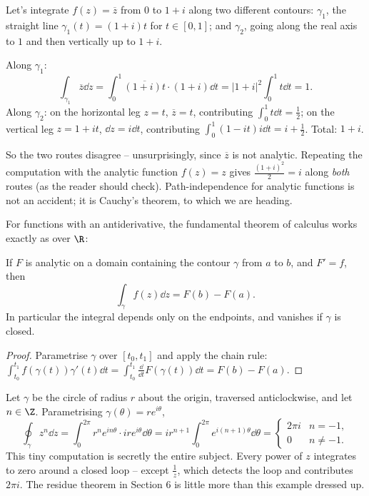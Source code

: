 \begin{example}
	Let's integrate $f(z) = \overline z$ from $0$ to $1 + i$ along two different contours: $\gamma_1$, the straight line $\gamma_1(t) = (1 + i)t$ for $t \in [0,1]$; and $\gamma_2$, going along the real axis to $1$ and then vertically up to $1 + i$.

	Along $\gamma_1$:
	$$
	\int_{\gamma_1} \overline z \dd z = \int_0^1 \overline{(1+i)t} \cdot (1 + i) \dd t = |1 + i|^2 \int_0^1 t \dd t = 1.
	$$
	Along $\gamma_2$: on the horizontal leg $z = t$, $\overline z = t$, contributing $\int_0^1 t \dd t = \frac 12$; on the vertical leg $z = 1 + it$, $\dd z = i \dd t$, contributing $\int_0^1 (1 - it) i \dd t = i + \frac{1}{2}$. Total: $1 + i$.

	So the two routes disagree -- unsurprisingly, since $\overline z$ is not analytic. Repeating the computation with the analytic function $f(z) = z$ gives $\frac{(1+i)^2}{2} = i$ along \emph{both} routes (as the reader should check). Path-independence for analytic functions is not an accident; it is Cauchy's theorem, to which we are heading.
\end{example}

For functions with an antiderivative, the fundamental theorem of calculus works exactly as over $\R$:

\begin{proposition}
	If $F$ is analytic on a domain containing the contour $\gamma$ from $a$ to $b$, and $F' = f$, then
	$$
	\int_\gamma f(z) \dd z = F(b) - F(a).
	$$
	In particular the integral depends only on the endpoints, and vanishes if $\gamma$ is closed.
\end{proposition}
\begin{proof}
	Parametrise $\gamma$ over $[t_0, t_1]$ and apply the chain rule: $\int_{t_0}^{t_1} f(\gamma(t))\gamma'(t) \dd t = \int_{t_0}^{t_1} \frac{\dd}{\dd t} F(\gamma(t)) \dd t = F(b) - F(a)$.
\end{proof}

\begin{example}
	Let $\gamma$ be the circle of radius $r$ about the origin, traversed anticlockwise, and let $n \in \Z$. Parametrising $\gamma(\theta) = re^{i\theta}$,
	$$
	\oint_\gamma z^n \dd z = \int_0^{2\pi} r^n e^{in\theta} \cdot ir e^{i\theta} \dd \theta = i r^{n+1}\int_0^{2\pi} e^{i(n+1)\theta} \dd\theta =
	\begin{cases}
		2\pi i & n = -1, \\
		0 & n \neq -1.
	\end{cases}
	$$
	This tiny computation is secretly the entire subject. Every power of $z$ integrates to zero around a closed loop -- except $\frac 1z$, which detects the loop and contributes $2\pi i$. The residue theorem in Section 6 is little more than this example dressed up.
\end{example}

